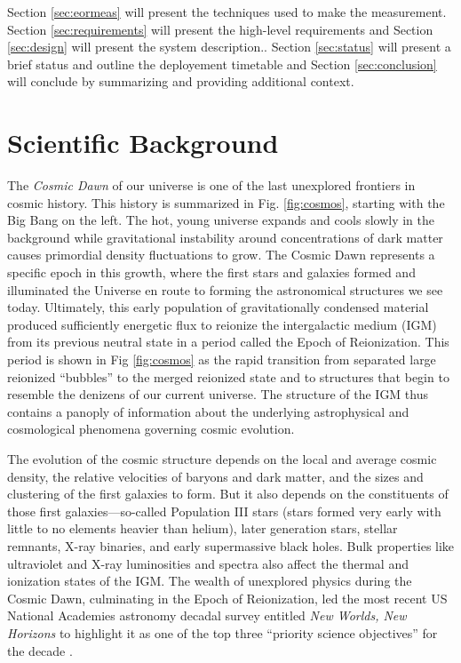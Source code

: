 \documentclass[preprint,11pt]{aastex}
\begin{document}
Section \ref{sec:eormeas} will present the techniques used to make the measurement.  Section \ref{sec:requirements} will present the high-level requirements and Section \ref{sec:design} will present the system description..   Section \ref{sec:status} will present a brief status and outline the deployement timetable and Section \ref{sec:conclusion} will conclude by summarizing and providing additional context.




\section{Scientific Background}
\label{sec:science}

The {\it Cosmic Dawn} of our universe is one of the last unexplored
frontiers in cosmic history.  This history is summarized in Fig. \ref{fig:cosmos}, starting with the Big Bang on the left. The hot, young universe expands and cools slowly in the background while gravitational instability around concentrations of dark matter causes primordial density fluctuations to grow.
The Cosmic Dawn represents a specific epoch in this growth, where the first stars and galaxies formed and illuminated the Universe en route to forming the astronomical structures we see today. Ultimately, this early population of gravitationally condensed material produced sufficiently energetic flux to reionize the intergalactic medium (IGM) from its previous neutral state in a period called the Epoch of Reionization.  This period is shown in Fig \ref{fig:cosmos} as the rapid transition from separated large reionized ``bubbles'' to the merged reionized state and to structures that begin to resemble the denizens of our current universe. The structure of the 
IGM thus contains a panoply of information about the underlying astrophysical and cosmological phenomena governing cosmic evolution.

The evolution of the cosmic structure depends on the local and average cosmic density, the relative velocities of
baryons and dark matter, and the sizes and clustering of the first galaxies to form.
But it also depends on the constituents of those first galaxies---so-called Population
III stars (stars formed very early with little to no elements heavier than helium), later generation stars, stellar remnants, X-ray binaries,
and early supermassive black holes.  Bulk properties like
ultraviolet and X-ray luminosities and spectra also affect the thermal and
ionization states of the IGM.  The wealth of unexplored physics during the Cosmic Dawn,
culminating in the Epoch of Reionization, 
led the most recent US National Academies astronomy decadal survey entitled {\em New Worlds, New Horizons} to highlight it as one of the top three ``priority science objectives'' for
the decade \citep{NWNH}.
\end{document}
